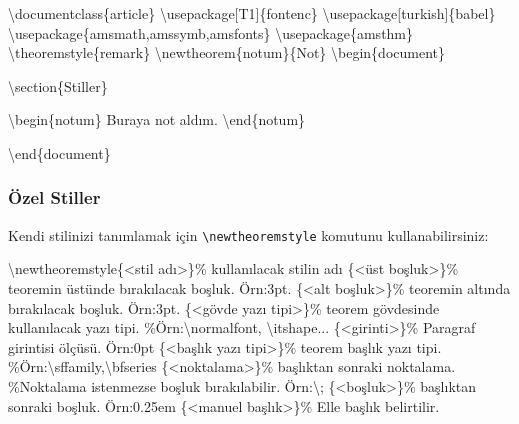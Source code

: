 \documentclass[
  letterpaper,
  DIV=11,
  numbers=noendperiod]{scrreprt}
\newenvironment{Shaded}{\begin{snugshade}}{\end{snugshade}}
\newcommand{\BuiltInTok}[1]{\textcolor[rgb]{0.00,0.23,0.31}{#1}}
\newcommand{\CommentTok}[1]{\textcolor[rgb]{0.37,0.37,0.37}{#1}}
\newcommand{\ExtensionTok}[1]{\textcolor[rgb]{0.00,0.23,0.31}{#1}}
\newcommand{\FunctionTok}[1]{\textcolor[rgb]{0.28,0.35,0.67}{#1}}
\newcommand{\KeywordTok}[1]{\textcolor[rgb]{0.00,0.23,0.31}{#1}}
\newcommand{\NormalTok}[1]{\textcolor[rgb]{0.00,0.23,0.31}{#1}}
\begin{document}
\begin{Shaded}
\begin{Highlighting}[]
\BuiltInTok{\textbackslash{}documentclass}\NormalTok{\{}\ExtensionTok{article}\NormalTok{\}}
\BuiltInTok{\textbackslash{}usepackage}\NormalTok{[T1]\{}\ExtensionTok{fontenc}\NormalTok{\}}
\BuiltInTok{\textbackslash{}usepackage}\NormalTok{[turkish]\{}\ExtensionTok{babel}\NormalTok{\}}
\BuiltInTok{\textbackslash{}usepackage}\NormalTok{\{}\ExtensionTok{amsmath,amssymb,amsfonts}\NormalTok{\}}
\BuiltInTok{\textbackslash{}usepackage}\NormalTok{\{}\ExtensionTok{amsthm}\NormalTok{\}}
\FunctionTok{\textbackslash{}theoremstyle}\NormalTok{\{remark\}}
\FunctionTok{\textbackslash{}newtheorem}\NormalTok{\{notum\}\{Not\}}
\KeywordTok{\textbackslash{}begin}\NormalTok{\{}\ExtensionTok{document}\NormalTok{\}}

\KeywordTok{\textbackslash{}section}\NormalTok{\{Stiller\}}

\KeywordTok{\textbackslash{}begin}\NormalTok{\{}\ExtensionTok{notum}\NormalTok{\}}
\NormalTok{ Buraya not aldım.}
\KeywordTok{\textbackslash{}end}\NormalTok{\{}\ExtensionTok{notum}\NormalTok{\}}



\KeywordTok{\textbackslash{}end}\NormalTok{\{}\ExtensionTok{document}\NormalTok{\}}
\end{Highlighting}
\end{Shaded}

\hypertarget{uxf6zel-stiller}{%
\subsubsection{Özel Stiller}\label{uxf6zel-stiller}}

Kendi stilinizi tanımlamak için \texttt{\textbackslash{}newtheoremstyle}
komutunu kullanabilirsiniz:

\begin{Shaded}
\begin{Highlighting}[]
\FunctionTok{\textbackslash{}newtheoremstyle}\NormalTok{\{\textless{}stil adı\textgreater{}\}}\CommentTok{\% kullanılacak stilin adı}
\NormalTok{\{\textless{}üst boşluk\textgreater{}\}}\CommentTok{\% teoremin üstünde bırakılacak boşluk. Örn:3pt.}
\NormalTok{\{\textless{}alt boşluk\textgreater{}\}}\CommentTok{\% teoremin altında bırakılacak boşluk. Örn:3pt.}
\NormalTok{\{\textless{}gövde yazı tipi\textgreater{}\}}\CommentTok{\% teorem gövdesinde kullanılacak yazı tipi.}
 \CommentTok{\%Örn:\textbackslash{}normalfont, \textbackslash{}itshape...}
\NormalTok{\{\textless{}girinti\textgreater{}\}}\CommentTok{\% Paragraf girintisi ölçüsü. Örn:0pt}
\NormalTok{\{\textless{}başlık yazı tipi\textgreater{}\}}\CommentTok{\% teorem başlık yazı tipi.}
 \CommentTok{\%Örn:\textbackslash{}sffamily,\textbackslash{}bfseries}
\NormalTok{\{\textless{}noktalama\textgreater{}\}}\CommentTok{\% başlıktan sonraki noktalama.}
 \CommentTok{\%Noktalama istenmezse boşluk bırakılabilir. Örn:\textbackslash{}; }
\NormalTok{\{\textless{}boşluk\textgreater{}\}}\CommentTok{\% başlıktan sonraki boşluk. Örn:0.25em}
\NormalTok{\{\textless{}manuel başlık\textgreater{}\}}\CommentTok{\% Elle başlık belirtilir.}
\end{Highlighting}
\end{Shaded}
\end{document}
